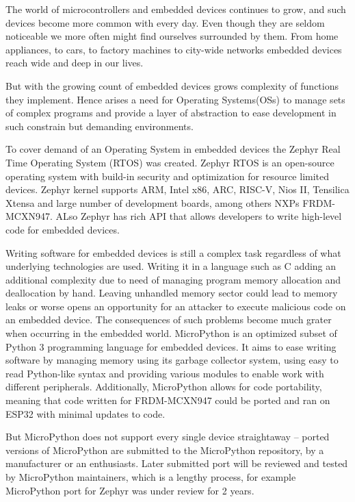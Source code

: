 \documentclass[twoside, 12pt]{article}
\begin{document}
\obsah

\listoffigures

The world of microcontrollers and embedded devices continues to grow, and such devices become 
more common with every day. Even though they are seldom noticeable we more often might find 
ourselves surrounded by them. From home appliances, to cars, to factory machines to city-wide 
networks embedded devices reach wide and deep in our lives.

But with the growing count of embedded devices grows complexity of functions they implement. 
Hence arises a need for Operating Systems(OSs) to manage sets of complex programs and provide 
a layer of abstraction to ease development in such constrain but demanding environments.

To cover demand of an Operating System in embedded devices the Zephyr Real Time Operating 
System (RTOS) was created. Zephyr RTOS is an open-source operating system with build-in 
security and optimization for resource limited devices. Zephyr kernel supports ARM, Intel 
x86, ARC, RISC-V, Nios II, Tensilica Xtensa and large number of development boards, among 
others NXPs FRDM-MCXN947. ALso Zephyr has rich API that allows developers to write high-level 
code for embedded devices.

Writing software for embedded devices is still a complex task regardless of what underlying 
technologies are used. Writing it in a language such as C adding an additional complexity
due to need of managing program memory allocation and deallocation by hand.
Leaving unhandled memory sector could lead to memory leaks or worse opens an opportunity for
an attacker to execute malicious code on an embedded device. The consequences of such problems
become much grater when occurring in the embedded world. MicroPython is an optimized subset 
of Python 3 programming language for embedded devices. It aims to ease writing software by 
managing memory using its garbage collector system, using easy to read Python-like syntax and 
providing various modules to enable work with different peripherals. Additionally, 
MicroPython allows for code portability, meaning that code written for FRDM-MCXN947
could be ported and ran on ESP32 with minimal updates to code. 

But MicroPython does not 
support every single device straightaway -- ported versions of MicroPython are submitted to 
the MicroPython repository, by a manufacturer or an enthusiasts. Later submitted port will be 
reviewed and tested by MicroPython maintainers, which is a lengthy process, for example 
MicroPython port for Zephyr was under review for 2 years.
\end{document}
